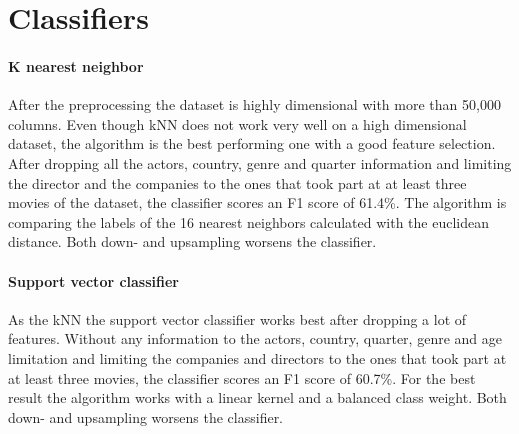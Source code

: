 \section {Classifiers}
\paragraph{K nearest neighbor}
After the preprocessing the dataset is highly dimensional with more than 50,000 columns. Even though kNN does not work very well on a high dimensional dataset, the algorithm is the best performing one with a good feature selection. After dropping all the actors, country, genre and quarter information and limiting the director and the companies to the ones that took part at at least three movies of the dataset, the classifier scores an F1 score of 61.4\%. The algorithm is comparing the labels of the 16 nearest neighbors calculated with the euclidean distance. Both down- and upsampling worsens the classifier. 

\paragraph{Support vector classifier}
As the kNN the support vector classifier works best after dropping a lot of features. Without any information to the actors, country, quarter, genre and age limitation and limiting the companies and directors to the ones that took part at at least three movies, the classifier scores an F1 score of 60.7\%. For the best result the algorithm works with a linear kernel and a balanced class weight. Both down- and upsampling worsens the classifier.


